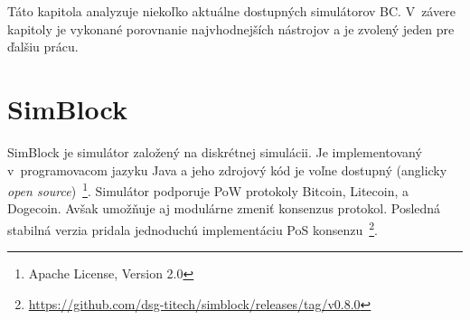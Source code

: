 Táto kapitola analyzuje niekoľko aktuálne dostupných simulátorov BC. V~závere kapitoly je vykonané porovnanie najvhodnejších nástrojov a je zvolený jeden pre ďalšiu prácu.




\section{SimBlock}

SimBlock je simulátor založený na diskrétnej simulácii. Je implementovaný v~programovacom jazyku Java a jeho zdrojový kód je voľne dostupný (anglicky \textit{open source})~\footnote{Apache License, Version 2.0}. Simulátor podporuje PoW protokoly Bitcoin, Litecoin, a Dogecoin. Avšak umožňuje aj modulárne zmeniť konsenzus protokol. Posledná stabilná verzia pridala jednoduchú implementáciu PoS konsenzu~\footnote{\url{https://github.com/dsg-titech/simblock/releases/tag/v0.8.0}}.

